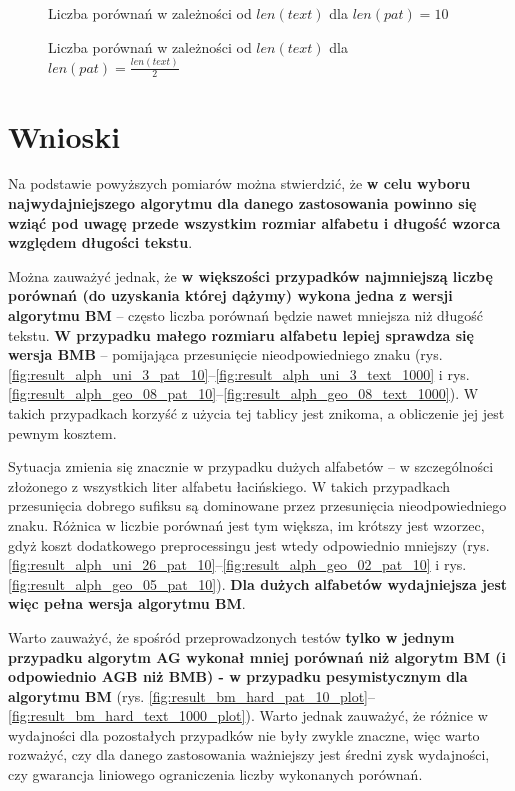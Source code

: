 \begin{figure}[htb]
    \centering
    
    \hfill
    \caption{Liczba porównań w zależności od $len(text)$ dla $len(pat) = 10$}
    \label{fig:result_ag_hard_pat_10_plot}
\end{figure}

\begin{figure}[htb]
    \centering
    
    \hfill
    \caption{Liczba porównań w zależności od $len(text)$ dla $len(pat) = \frac{len(text)}{2}$}
    \label{fig:result_ag_hard_pat_len(text)2_plot}
\end{figure}

\FloatBarrier
\newpage
\section{Wnioski}
Na podstawie powyższych pomiarów można stwierdzić, że \textbf{w celu wyboru najwydajniejszego algorytmu dla danego zastosowania powinno się wziąć pod uwagę przede wszystkim rozmiar alfabetu i długość wzorca względem długości tekstu}. 

Można zauważyć jednak, że \textbf{w większości przypadków najmniejszą liczbę porównań (do uzyskania której dążymy) wykona jedna z wersji algorytmu BM} -- często liczba porównań będzie nawet mniejsza niż długość tekstu. \textbf{W przypadku małego rozmiaru alfabetu lepiej sprawdza się wersja BMB} -- pomijająca przesunięcie nieodpowiedniego znaku (rys. \ref{fig:result_alph_uni_3_pat_10}--\ref{fig:result_alph_uni_3_text_1000} i rys. \ref{fig:result_alph_geo_08_pat_10}--\ref{fig:result_alph_geo_08_text_1000}). W takich przypadkach korzyść z użycia tej tablicy jest znikoma, a obliczenie jej jest pewnym kosztem. 

Sytuacja zmienia się znacznie w przypadku dużych alfabetów -- w szczególności złożonego z wszystkich liter alfabetu łacińskiego. W takich przypadkach przesunięcia dobrego sufiksu są dominowane przez przesunięcia nieodpowiedniego znaku. Różnica w liczbie porównań jest tym większa, im krótszy jest wzorzec, gdyż koszt dodatkowego preprocessingu jest wtedy odpowiednio mniejszy (rys. \ref{fig:result_alph_uni_26_pat_10}--\ref{fig:result_alph_geo_02_pat_10} i rys. \ref{fig:result_alph_geo_05_pat_10}). \textbf{Dla dużych alfabetów wydajniejsza jest więc pełna wersja algorytmu BM}.

Warto zauważyć, że spośród przeprowadzonych testów \textbf{tylko w jednym przypadku algorytm AG wykonał mniej porównań niż algorytm BM (i odpowiednio AGB niż BMB) - w przypadku pesymistycznym dla algorytmu BM} (rys. \ref{fig:result_bm_hard_pat_10_plot}--\ref{fig:result_bm_hard_text_1000_plot}). Warto jednak zauważyć, że różnice w wydajności dla pozostałych przypadków nie były zwykle znaczne, więc warto rozważyć, czy dla danego zastosowania ważniejszy jest średni zysk wydajności, czy gwarancja liniowego ograniczenia liczby wykonanych porównań.

